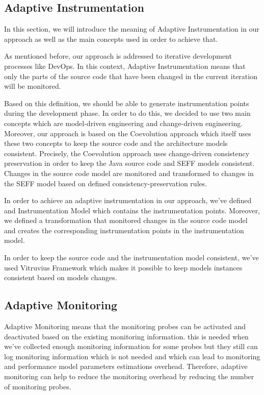 \subsection{Adaptive Instrumentation}
\label{sec:Adaptive Instrumentation}
In this section, we will introduce the meaning of Adaptive Instrumentation in our approach as well as the main concepts used in order to achieve that.

As mentioned before, our approach is addressed to iterative development processes like DevOps. In this context, Adaptive Instrumentation means that only the parts of the source code that have been changed in the current iteration will be monitored. 

Based on this definition, we should be able to generate instrumentation points during the development phase. In order to do this, we decided to use two main concepts which are model-driven engineering and change-driven engineering. Moreover, our approach is based on the Coevolution approach which itself uses these two concepts to keep the source code and the architecture models consistent. Precisely, the Coevolution approach uses change-driven consistency preservation in order to keep the Java source code and SEFF models consistent. Changes in the source code model are monitored and transformed to changes in the SEFF model based on defined consistency-preservation rules. 

In order to achieve an adaptive instrumentation in our approach, we’ve defined and Instrumentation Model which contains the instrumentation points. Moreover, we defined a transformation that monitored changes in the source code model and creates the corresponding instrumentation points in the instrumentation model. 

In order to keep the source code and the instrumentation model consistent, we've used Vitruvius Framework which makes it possible to keep models instances consistent based on models changes. 

\subsection{Adaptive Monitoring}
\label{sec:Adaptive Monitoring}
Adaptive Monitoring means that the monitoring probes can be activated and deactivated based on the existing monitoring information. this is needed when we’ve collected enough monitoring information for some probes but they still can log monitoring information which is not needed and which can lead to monitoring and performance model parameters estimations overhead.  Therefore, adaptive monitoring can help to reduce the monitoring overhead by reducing the number of monitoring probes. 

